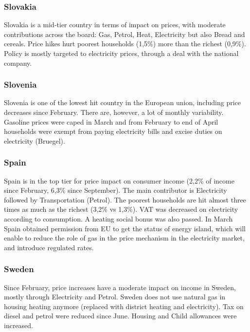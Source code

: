 \documentclass[
  9pt,
  a4paper,
  DIV=11,
  numbers=noendperiod]{scrartcl}
\begin{document}
\hypertarget{slovakia}{%
\subsubsection{Slovakia}\label{slovakia}}

Slovakia is a mid-tier country in terms of impact on prices, with
moderate contributions across the board: Gas, Petrol, Heat, Electricity
but also Bread and cereals. Price hikes hurt poorest households (1,5\%)
more than the richest (0,9\%). Policy is mostly targeted to electricity
prices, through a deal with the national company.

\hypertarget{slovenia}{%
\subsubsection{Slovenia}\label{slovenia}}

Slovenia is one of the lowest hit country in the European union,
including price decreases since February. There are, however, a lot of
monthly variability. Gasoline prices were caped in March and from
February to end of April households were exempt from paying electricity
bills and excise duties on electricity (Bruegel).

\hypertarget{spain}{%
\subsubsection{Spain}\label{spain}}

Spain is in the top tier for price impact on consumer income (2,2\% of
income since February, 6,3\% since September). The main contributor is
Electricity followed by Transportation (Petrol). The poorest households
are hit almost three times as much as the richest (3,2\% vs 1,3\%). VAT
was decreased on electricity according to consumption. A heating social
bonus was also passed. In March Spain obtained permission from EU to get
the status of energy island, which will enable to reduce the role of gas
in the price mechanism in the electricity market, and introduce
regulated rates.

\hypertarget{sweden}{%
\subsubsection{Sweden}\label{sweden}}

Since February, price increases have a moderate impact on income in
Sweden, mostly through Electricity and Petrol. Sweden does not use
natural gas in housing heating anymore (replaced with district heating
and electricity). Tax on diesel and petrol were reduced since June.
Housing and Child allowances were increased.
\end{document}
